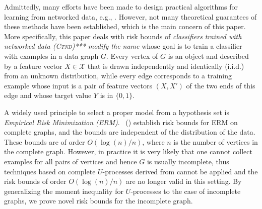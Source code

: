 \documentclass[letterpaper]{article} %
\newcommand{\xspace}{\mathcal{X}}
\newcommand{\pair}[1]{(#1)}
\newcommand{\problemabbr}{\textnormal{C}\textsc{tnd}}
\newcommand{\set}[1]{\{#1\}}
\newcommand{\citet}[1]{\citeauthor{#1}\ (\citeyear{#1})}
\begin{document}
Admittedly, many efforts have been made to design practical algorithms for learning from networked data, e.g., \cite{pieter2003link,al2006link,macskassy2007classification}. 
However, not many theoretical guarantees of these methods have been established, which is the main concern of this paper. More specifically, this paper deals with risk bounds of \emph{classifiers trained with networked data (\problemabbr{})*** modify the name} whose goal is to train a classifier with examples in a data graph $G$. 
Every vertex of $G$ is an object and described by a feature vector $X\in \xspace{}$ that is drawn independently and identically (i.i.d.) from an unknown distribution, while every edge corresponds to a training example whose input is a pair of feature vectors $\pair{X,X'}$ of the two ends of this edge and whose target value $Y$ is in $\{0,1\}$.

A widely used principle to select a proper model from a hypothesis set is \emph{Empirical Risk Minimization (ERM)}. %
\citet{papa2016graph} establish risk bounds for ERM on complete graphs, and the bounds are independent of the distribution of the data. 
These bounds are of order $O(\log(n)/n)$, where $n$ is the number of vertices in the complete graph. 
However, in practice it is very likely that one cannot collect examples for all pairs of vertices and hence $G$ is usually incomplete, thus techniques based on complete $U$-processes derived from \cite{papa2016graph} cannot be applied and the risk bounds of order $O(\log(n)/n)$ are no longer valid in this setting. 
By generalizing the moment inequality for $U$-processes to the case of incomplete graphs, we prove novel risk bounds for the incomplete graph.  
\end{document}
